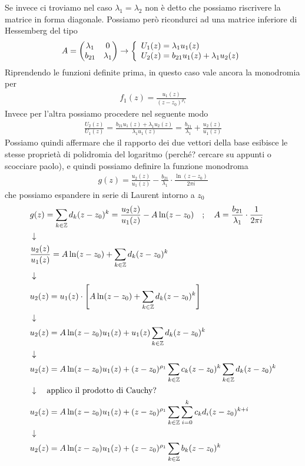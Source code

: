 Se invece ci troviamo nel caso $\lambda_1 = \lambda_2$ non è detto che possiamo riscrivere la matrice in forma diagonale. Possiamo però ricondurci ad una matrice inferiore di Hessemberg del tipo
\begin{align}
	A = \begin{pmatrix}
		\lambda_1 & 0        \\
		b_{21}    & \lambda_1
	\end{pmatrix} \to \double{U_1(z) = \lambda_1 u_1(z) \hfill}{U_2(z) = b_{21} u_1(z) + \lambda_1 u_2(z)}
\end{align}
Riprendendo le funzioni definite prima, in questo caso vale ancora la monodromia per
\begin{align}
	f_1(z) =  \frac{u_1(z)}{(z-z_0)^{\rho_1}}
\end{align}
Invece per l'altra possiamo procedere nel seguente modo
\begin{align}
	\frac{U_2(z)}{U_1(z)} = \frac{b_{21} u_1(z) + \lambda_1 u_2(z)}{\lambda_1 u_1(z)} = \frac{b_{21}}{\lambda_1} + \frac{u_2(z)}{u_1(z)} 
\end{align}
Possiamo quindi affermare che il rapporto dei due vettori della base esibisce le stesse proprietà di polidromia del logaritmo (perché? cercare su appunti o scocciare paolo), e quindi possiamo definire la funzione monodroma
\begin{align}
	g(z) = \frac{u_2(z)}{u_1(z)} - \frac{b_{21}}{\lambda_1} \cdot \frac{\ln (z-z_0)}{2\pi i}
\end{align}
che possiamo espandere in serie di Laurent intorno a $z_0$
\begin{align}
	&g(z) = \sum_{k\in \mathbb{Z}}d_k (z-z_0)^k = \frac{u_2(z)}{u_1(z)} -A\ln (z-z_0) \quad ; \quad A = \frac{b_{21}}{\lambda_1} \cdot \frac{1}{2\pi i} \\ &\downarrow \nonumber \\
	&\frac{u_2(z)}{u_1(z)} = A\ln (z-z_0) + \sum_{k\in \mathbb{Z}}d_k (z-z_0)^k\nonumber \\ &\downarrow \nonumber \\
	&u_2(z) = u_1(z) \cdot \left[ A\ln (z-z_0) + \sum_{k\in \mathbb{Z}}d_k (z-z_0)^k \right] \nonumber \\ &\downarrow \nonumber \\
	&u_2(z) = A\ln(z-z_0)u_1(z) + u_1(z) \sum_{k\in \mathbb{Z}}d_k (z-z_0)^k\nonumber \\ &\downarrow \nonumber \\
	&u_2(z) = A\ln(z-z_0)u_1(z) + (z-z_0)^{\rho_1}\sum_{k\in \mathbb{Z}} c_k (z-z_0)^k \sum_{k\in \mathbb{Z}}d_k (z-z_0)^k\nonumber \\ &\downarrow \quad \text{applico il prodotto di Cauchy?} \nonumber \\
	&u_2(z) = A\ln(z-z_0)u_1(z) + (z-z_0)^{\rho_1}\sum_{k\in \mathbb{Z}}\sum_{i=0}^{k} c_k d_i (z-z_0)^{k+i}\nonumber \\ &\downarrow \nonumber \\
	&u_2(z) = A\ln(z-z_0)u_1(z) + (z-z_0)^{\rho_1} \sum_{k\in \mathbb{Z}}b_k (z-z_0)^k
\end{align}

\newpage

